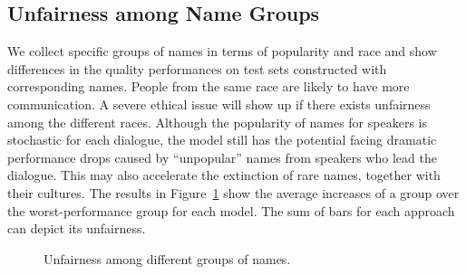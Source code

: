 

\subsection{Unfairness among Name Groups}
\label{sec:unfairness}
We collect specific groups of names in terms of popularity and race and show differences in the quality performances on test sets constructed with corresponding names. 
People from the same race are likely to have more communication. A severe ethical issue will show up if there exists unfairness among the different races. Although the popularity of names for speakers is stochastic for each dialogue, the model still has the potential facing dramatic performance drops caused by ``unpopular'' names from speakers who lead the dialogue. This may also accelerate the extinction of rare names, together with their cultures.
The results in Figure~\ref{fig:groups} show the average increases of a group over the worst-performance group for each model. The sum of bars for each approach can depict its unfairness. 

\begin{figure}[t]
	\centering
	\begin{minipage}[t]{\linewidth}
		\centering
	\end{minipage}%
	
	\begin{minipage}[t]{\linewidth}
		\centering
	\end{minipage}
	\centering
	\caption{Unfairness among different groups of names.}	
	\label{fig:groups}
\end{figure}


